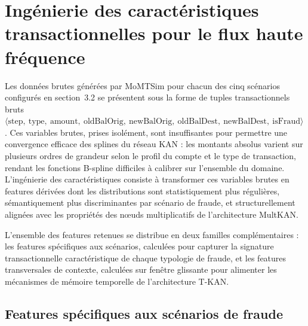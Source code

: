 \documentclass[11pt,a4paper,oneside]{report}
\theoremstyle{definition}
\theoremstyle{remark}
\begin{document}
\section{Ingénierie des caractéristiques transactionnelles pour le flux haute fréquence}

Les données brutes générées par MoMTSim pour chacun des cinq scénarios configurés en section~3.2 se présentent sous la forme de tuples transactionnels bruts $\langle \text{step},\ \text{type},\ \text{amount},\ \text{oldBalOrig},\ \text{newBalOrig},\ \text{oldBalDest},\ \text{newBalDest},\ \text{isFraud} \rangle$. Ces variables brutes, prises isolément, sont insuffisantes pour permettre une convergence efficace des splines du réseau KAN : les montants absolus varient sur plusieurs ordres de grandeur selon le profil du compte et le type de transaction, rendant les fonctions B-spline difficiles à calibrer sur l'ensemble du domaine. L'ingénierie des caractéristiques consiste à transformer ces variables brutes en features dérivées dont les distributions sont statistiquement plus régulières, sémantiquement plus discriminantes par scénario de fraude, et structurellement alignées avec les propriétés des nœuds multiplicatifs de l'architecture MultKAN.

L'ensemble des features retenues se distribue en deux familles complémentaires : les features spécifiques aux scénarios, calculées pour capturer la signature transactionnelle caractéristique de chaque typologie de fraude, et les features transversales de contexte, calculées sur fenêtre glissante pour alimenter les mécanismes de mémoire temporelle de l'architecture T-KAN.

\subsection{Features spécifiques aux scénarios de fraude}
\end{document}
